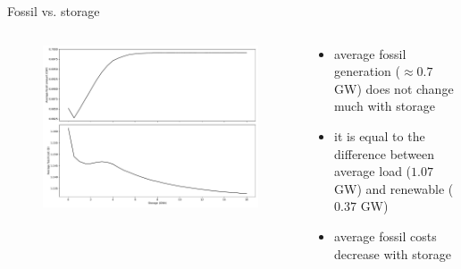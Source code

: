 \documentclass[aspectratio=169,11pt]{beamer}
\begin{document}
\begin{frame}{Fossil vs. storage}
\begin{columns}
    \begin{column}{0.6\textwidth}
        \begin{figure}
            \centering
            \includegraphics[width=\columnwidth]{./figures/p2.pdf}
        \end{figure}
    \end{column}
    \begin{column}{0.4\textwidth}
        \begin{itemize}
            \item average fossil generation ($\approx 0.7$ GW) does not change much with storage
            \item it is equal to the difference between average load ($1.07$ GW) and renewable ($0.37$ GW)
            \item average fossil costs decrease with storage
        \end{itemize}
    \end{column}
\end{columns}
\end{frame}
\end{document}

